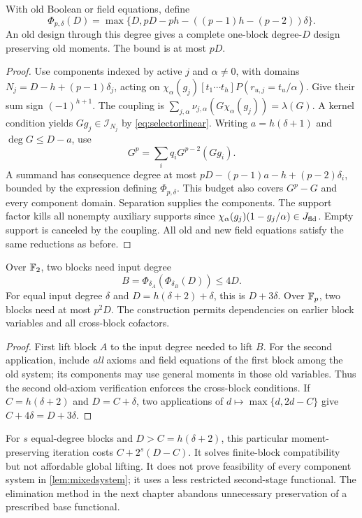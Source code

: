 \begin{lemma}\label{lem:supported-p}
With old Boolean or field equations, define
\[
 \Phi_{p,\delta}(D)=\max\{D,
 pD-ph-((p-1)h-(p-2))\delta\}.
\]
An old design through this degree gives a complete one-block degree-$D$ design preserving old moments. The bound is at most $pD$.
\end{lemma}
\begin{proof}
Use components indexed by active $j$ and $\alpha\ne0$, with domains
$N_j=D-h+(p-1)\delta_j$, acting on
$\chi_\alpha(g_j)[t_1\cdots t_h]P(r_{u,j}=t_u/\alpha)$.
Give their sum sign $(-1)^{h+1}$. The coupling is
$\sum_{j,\alpha}\nu_{j,\alpha}(G\chi_\alpha(g_j))=\lambda(G)$.
A kernel condition yields $Gg_j\in\mathcal I_{N_j}$ by \eqref{eq:selectorlinear}. Writing $a=h(\delta+1)$ and $\deg G\le D-a$, use
\[
 G^p=\sum_iq_iG^{p-2}(Gg_i).
\]
A summand has consequence degree at most
$pD-(p-1)a-h+(p-2)\delta_i$, bounded by the expression defining $\Phi_{p,\delta}$. This budget also covers $G^p-G$ and every component domain. Separation supplies the components. The support factor kills all nonempty auxiliary supports since
$\chi_\alpha(g_j)(1-g_j/\alpha)\in J_{\mathrm{fld}}$.
Empty support is canceled by the coupling. All old and new field equations satisfy the same reductions as before.
\end{proof}

\begin{corollary}\label{cor:twoblocks}
Over $\mathbb F_2$, two blocks need input degree
\[
 B=\Phi_{\delta_A}(\Phi_{\delta_B}(D))\le4D.
\]
For equal input degree $\delta$ and $D=h(\delta+2)+\delta$, this is $D+3\delta$. Over $\mathbb F_p$, two blocks need at most $p^2D$. The construction permits dependencies on earlier block variables and all cross-block cofactors.
\end{corollary}
\begin{proof}
First lift block $A$ to the input degree needed to lift $B$. For the second application, include \emph{all} axioms and field equations of the first block among the old system; its components may use general moments in those old variables. Thus the second old-axiom verification enforces the cross-block conditions. If $C=h(\delta+2)$ and $D=C+\delta$, two applications of $d\mapsto\max\{d,2d-C\}$ give $C+4\delta=D+3\delta$.
\end{proof}

\begin{remark}
For $s$ equal-degree blocks and $D>C=h(\delta+2)$, this particular moment-preserving iteration costs $C+2^s(D-C)$. It solves finite-block compatibility but not affordable global lifting. It does not prove feasibility of every component system in \cref{lem:mixedsystem}; it uses a less restricted second-stage functional. The elimination method in the next chapter abandons unnecessary preservation of a prescribed base functional.
\end{remark}
